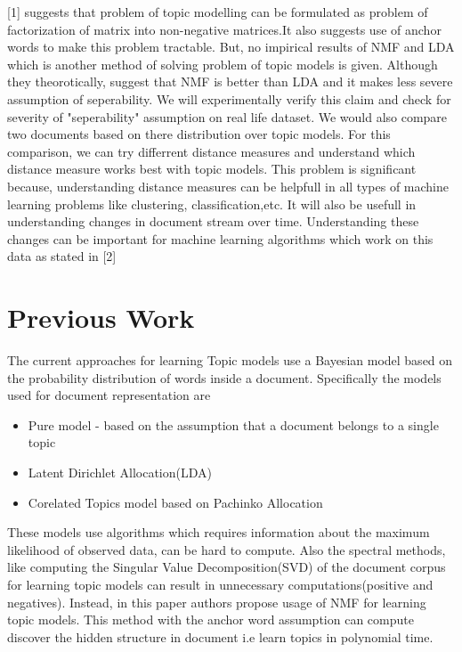 \documentclass[a4paper,11pt]{article}
\begin{document}
[1] suggests that problem of topic modelling can be formulated as problem of factorization of matrix into non-negative matrices.It also suggests use of anchor words to make this problem tractable. But, no impirical results of NMF and LDA which is another method of solving problem of topic models is given. Although they theorotically, suggest that NMF is better than LDA and it makes less severe assumption of seperability. We will experimentally verify this claim and check for severity of "seperability" assumption on real life dataset. We would also compare two documents based on there distribution over topic models. For this comparison, we can try differrent distance measures and understand which distance measure works best with topic models. This problem is significant because, understanding distance measures can be helpfull in all types of machine learning problems like clustering, classification,etc. It will also be usefull in understanding changes in document stream over time. Understanding these changes can be important for machine learning algorithms which work on this data as stated in [2]

\section{Previous Work}

The current approaches for learning Topic models use a Bayesian model based on the probability distribution of words inside a document. Specifically the models used for document representation are

\begin{itemize} 
\item Pure model - based on the assumption that a document belongs to a single topic
\item Latent Dirichlet Allocation(LDA)
\item Corelated Topics model based on Pachinko Allocation
\end{itemize}
These models use algorithms which requires information about the maximum likelihood of observed data, can be hard to compute. Also the spectral methods, like computing the Singular Value Decomposition(SVD) of the document corpus for learning topic models can result in unnecessary computations(positive and negatives). Instead, in this paper authors propose usage of NMF for learning topic models. This method with the anchor word assumption can compute discover the hidden structure in document i.e learn topics in polynomial time. 
\end{document}
